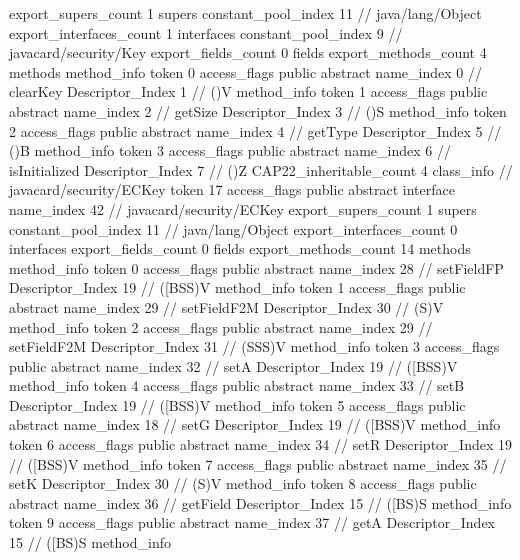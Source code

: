 {{{			export_supers_count	1
			supers {
				constant_pool_index	11		// java/lang/Object
			}
			export_interfaces_count	1
			interfaces {
				constant_pool_index	9		// javacard/security/Key
			}
			export_fields_count	0
			fields {
			}
			export_methods_count	4
			methods {
				method_info {
					token	0
					access_flags	public abstract
					name_index	0		// clearKey
					Descriptor_Index	1		// ()V
				}
				method_info {
					token	1
					access_flags	public abstract
					name_index	2		// getSize
					Descriptor_Index	3		// ()S
				}
				method_info {
					token	2
					access_flags	public abstract
					name_index	4		// getType
					Descriptor_Index	5		// ()B
				}
				method_info {
					token	3
					access_flags	public abstract
					name_index	6		// isInitialized
					Descriptor_Index	7		// ()Z
				}
			}
			CAP22_inheritable_count	4
		}
		class_info {		// javacard/security/ECKey
			token	17
			access_flags	public abstract interface
			name_index	42		// javacard/security/ECKey
			export_supers_count	1
			supers {
				constant_pool_index	11		// java/lang/Object
			}
			export_interfaces_count	0
			interfaces {
			}
			export_fields_count	0
			fields {
			}
			export_methods_count	14
			methods {
				method_info {
					token	0
					access_flags	public abstract
					name_index	28		// setFieldFP
					Descriptor_Index	19		// ([BSS)V
				}
				method_info {
					token	1
					access_flags	public abstract
					name_index	29		// setFieldF2M
					Descriptor_Index	30		// (S)V
				}
				method_info {
					token	2
					access_flags	public abstract
					name_index	29		// setFieldF2M
					Descriptor_Index	31		// (SSS)V
				}
				method_info {
					token	3
					access_flags	public abstract
					name_index	32		// setA
					Descriptor_Index	19		// ([BSS)V
				}
				method_info {
					token	4
					access_flags	public abstract
					name_index	33		// setB
					Descriptor_Index	19		// ([BSS)V
				}
				method_info {
					token	5
					access_flags	public abstract
					name_index	18		// setG
					Descriptor_Index	19		// ([BSS)V
				}
				method_info {
					token	6
					access_flags	public abstract
					name_index	34		// setR
					Descriptor_Index	19		// ([BSS)V
				}
				method_info {
					token	7
					access_flags	public abstract
					name_index	35		// setK
					Descriptor_Index	30		// (S)V
				}
				method_info {
					token	8
					access_flags	public abstract
					name_index	36		// getField
					Descriptor_Index	15		// ([BS)S
				}
				method_info {
					token	9
					access_flags	public abstract
					name_index	37		// getA
					Descriptor_Index	15		// ([BS)S
				}
				method_info {
}}}}}

